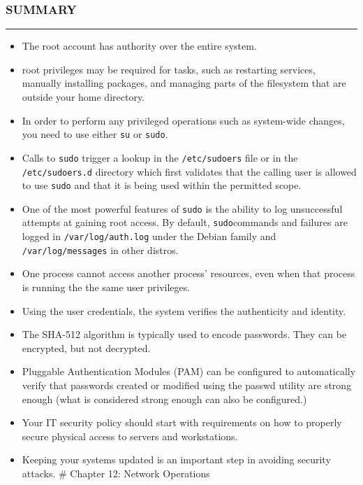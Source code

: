 \subsubsection{SUMMARY}\label{summary-9}

\begin{center}\rule{3in}{0.4pt}\end{center}

\begin{itemize}
\itemsep1pt\parskip0pt
\item
  The root account has authority over the entire system.
\item
  root privileges may be required for tasks, such as restarting
  services, manually installing packages, and managing parts of the
  filesystem that are outside your home directory.
\item
  In order to perform any privileged operations such as system-wide
  changes, you need to use either \texttt{su} or \texttt{sudo}.
\item
  Calls to \texttt{sudo} trigger a lookup in the \texttt{/etc/sudoers}
  file or in the \texttt{/etc/sudoers.d} directory which first validates
  that the calling user is allowed to use \texttt{sudo} and that it is
  being used within the permitted scope.
\item
  One of the most powerful features of \texttt{sudo} is the ability to
  log unsuccessful attempts at gaining root access. By default,
  \texttt{sudo}commands and failures are logged in
  \texttt{/var/log/auth.log} under the Debian family and
  \texttt{/var/log/messages} in other distros.
\item
  One process cannot access another process' resources, even when that
  process is running the the same user privileges.
\item
  Using the user credentials, the system verifies the authenticity and
  identity.
\item
  The SHA-512 algorithm is typically used to encode passwords. They can
  be encrypted, but not decrypted.
\item
  Pluggable Authentication Modules (PAM) can be configured to
  automatically verify that passwords created or modified using the
  passwd utility are strong enough (what is considered strong enough can
  also be configured.)
\item
  Your IT security policy should start with requirements on how to
  properly secure physical access to servers and workstations.
\item
  Keeping your systems updated is an important step in avoiding security
  attacks. \# Chapter 12: Network Operations
\end{itemize}

